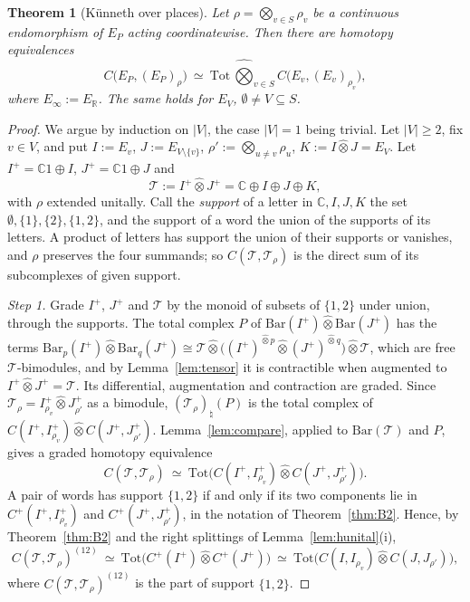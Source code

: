 \documentclass[11pt]{amsart}
\newtheorem{theorem}{Theorem}[section]
\theoremstyle{definition}
\theoremstyle{remark}
\newcommand{\C}{\mathbb C}
\newcommand{\R}{\mathbb R}
\begin{document}
\begin{theorem}[K\"unneth over places]\label{thm:kunneth}
Let $\rho=\bigotimes_{v\in S}\rho_v$ be a continuous endomorphism of $E_P$
acting coordinatewise.  Then there are homotopy equivalences
\begin{equation}\label{eq:kunneth}
C\bigl(E_P,(E_P)_{\rho}\bigr)\ \simeq\
\mathrm{Tot}\,\widehat\bigotimes_{v\in S}C\bigl(E_v,(E_v)_{\rho_v}\bigr),
\end{equation}
where $E_{\infty}:=E_{\R}$.  The same holds for $E_V$, $\emptyset\ne
V\subseteq S$.
\end{theorem}

\begin{proof}
We argue by induction on $|V|$, the case $|V|=1$ being trivial.  Let $|V|\ge2$,
fix $v\in V$, and put $I:=E_v$, $J:=E_{V\setminus\{v\}}$,
$\rho':=\bigotimes_{u\ne v}\rho_u$, $K:=I\widehat\otimes J=E_V$.  Let
$I^{+}=\C1\oplus I$, $J^{+}=\C1\oplus J$ and
\[
\mathcal T:=I^{+}\widehat\otimes J^{+}=\C\oplus I\oplus J\oplus K ,
\]
with $\rho$ extended unitally.  Call the \emph{support} of a letter in
$\C,I,J,K$ the set $\emptyset,\{1\},\{2\},\{1,2\}$, and the support of a word
the union of the supports of its letters.  A product of letters has support the
union of their supports or vanishes, and $\rho$ preserves the four summands;
so $C(\mathcal T,\mathcal T_{\rho})$ is the direct sum of its subcomplexes of given support.

\emph{Step 1.}  Grade $I^{+}$, $J^{+}$ and $\mathcal T$ by the monoid of subsets of
$\{1,2\}$ under union, through the supports.  The total complex $P$ of
$\mathrm{Bar}(I^{+})\widehat\otimes\mathrm{Bar}(J^{+})$ has the terms
$\mathrm{Bar}_p(I^{+})\widehat\otimes\mathrm{Bar}_q(J^{+})\cong
\mathcal T\widehat\otimes\bigl((I^{+})^{\widehat\otimes p}\widehat\otimes
(J^{+})^{\widehat\otimes q}\bigr)\widehat\otimes \mathcal T$, which are free
$\mathcal T$-bimodules, and by Lemma~\ref{lem:tensor} it is contractible when augmented
to $I^{+}\widehat\otimes J^{+}=\mathcal T$.  Its differential, augmentation and
contraction are graded.  Since $\mathcal T_{\rho}=I^{+}_{\rho_v}\widehat\otimes
J^{+}_{\rho'}$ as a bimodule, $(\mathcal T_{\rho})_{\natural}(P)$ is the total complex
of $C(I^{+},I^{+}_{\rho_v})\widehat\otimes C(J^{+},J^{+}_{\rho'})$.
Lemma~\ref{lem:compare}, applied to $\mathrm{Bar}(\mathcal T)$ and $P$, gives a graded
homotopy equivalence
\[
C(\mathcal T,\mathcal T_{\rho})\ \simeq\ \mathrm{Tot}\bigl(C(I^{+},I^{+}_{\rho_v})\widehat\otimes
C(J^{+},J^{+}_{\rho'})\bigr).
\]
A pair of words has support $\{1,2\}$ if and only if its two components lie in
$C^{+}(I^{+},I^{+}_{\rho_v})$ and $C^{+}(J^{+},J^{+}_{\rho'})$, in the
notation of Theorem~\ref{thm:B2}.  Hence, by Theorem~\ref{thm:B2} and the right
splittings of Lemma~\ref{lem:hunital}(i),
\[
C(\mathcal T,\mathcal T_{\rho})^{(12)}\ \simeq\ \mathrm{Tot}\bigl(C^{+}(I^{+})\widehat\otimes
C^{+}(J^{+})\bigr)\ \simeq\ \mathrm{Tot}\bigl(C(I,I_{\rho_v})\widehat\otimes
C(J,J_{\rho'})\bigr),
\]
where $C(\mathcal T,\mathcal T_{\rho})^{(12)}$ is the part of support $\{1,2\}$.


\end{proof}
\end{document}
